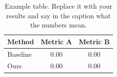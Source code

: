 \begin{table}[htbp]
  \centering
  \caption{Example table. Replace it with your results and say in the caption what the numbers mean.}
  \label{tab:example}
  \begin{tabular}{lcc}
    \toprule
    Method   & Metric A & Metric B \\
    \midrule
    Baseline & 0.00     & 0.00     \\
    Ours     & 0.00     & 0.00     \\
    \bottomrule
  \end{tabular}
\end{table}
